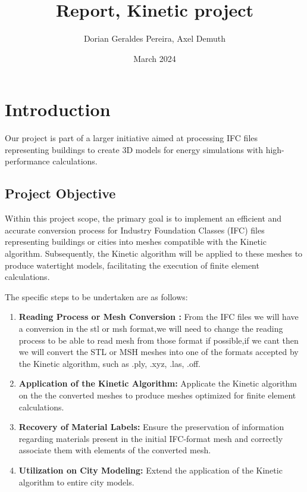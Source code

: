 \documentclass{article}
\title{Report, Kinetic project}
\author{Dorian Geraldes Pereira, Axel Demuth}
\date{March 2024}
\begin{document}
\maketitle
\tableofcontents
\newpage

\section{Introduction}

Our project is part of a larger initiative aimed at processing 
IFC files representing buildings to create 3D models for energy 
simulations with high-performance calculations.

\subsection{Project Objective}

Within this project scope, the primary goal is to implement an efficient and accurate 
conversion process for Industry Foundation Classes (IFC) 
files representing buildings or cities into meshes compatible with the 
Kinetic algorithm. Subsequently, the Kinetic algorithm will be applied to these 
meshes to produce watertight models, facilitating the execution of finite element calculations.

The specific steps to be undertaken are as follows:

\begin{enumerate}   
    \item \textbf{Reading Process or Mesh Conversion :} From the IFC files we will have a 
    conversion in the stl or msh format,we will need to change the reading process to be able 
    to read mesh from those format if possible,if we cant then we will convert the STL 
    or MSH meshes into one of the formats accepted by the Kinetic algorithm, 
    such as .ply, .xyz, .las, .off.
    
    \item \textbf{Application of the Kinetic Algorithm:} Applicate  
    the Kinetic algorithm on the the converted 
    meshes to produce meshes optimized for finite element calculations.
    
    \item \textbf{Recovery of Material Labels:} Ensure the preservation 
    of information regarding materials present in the initial IFC-format mesh 
    and correctly associate them with elements of the converted mesh.
    
    \item \textbf{Utilization on City Modeling:} Extend the application of 
    the Kinetic algorithm to entire city models.
\end{enumerate}
\end{document}
